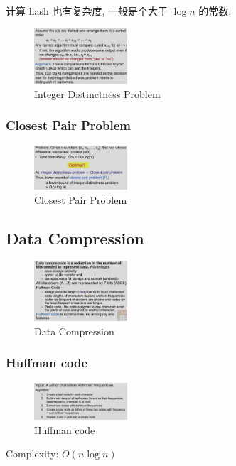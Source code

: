 计算 hash 也有复杂度, 一般是个大于 $\log n$ 的常数.

\begin{figure}[H]
    \centering
    \includegraphics[width=0.309\textwidth]{pic/DAA6//Integer Distinctness Problem1}
    \caption{Integer Distinctness Problem}
\end{figure}


\subsubsection{Closest Pair Problem}

\begin{figure}[H]
    \centering
    \includegraphics[width=0.309\textwidth]{pic/DAA6/Closest Pair Problem}
    \caption{Closest Pair Problem}
\end{figure}

\subsection{Data Compression}

\begin{figure}[H]
    \centering
    \includegraphics[width=0.309\textwidth]{pic/DAA6/Data Compression}
    \caption{Data Compression}
\end{figure}

\subsubsection{Huffman code}
\begin{figure}[H]
    \centering
    \includegraphics[width=0.309\textwidth]{pic/DAA6/Huffman code}
    \caption{Huffman code}
\end{figure}
Complexity: $O(n\log n)$


